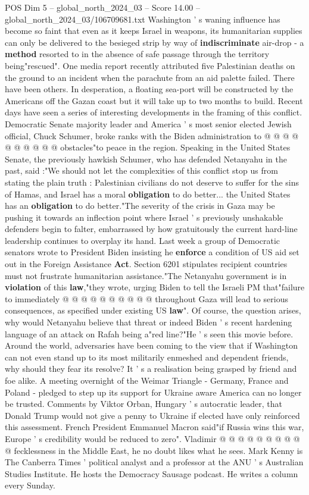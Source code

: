 \begin{textsample}{POS Dim 5 – global\_north\_2024\_03 – Score 14.00 – global\_north\_2024\_03/106709681.txt}
Washington ' s waning influence has become so faint that even as it keeps Israel in weapons, its humanitarian supplies can only be delivered to the besieged strip by way of \textbf{indiscriminate} air-drop - a \textbf{method} resorted to in the absence of safe passage through the territory being"rescued".
One media report recently attributed five Palestinian deaths on the ground to an incident when the parachute from an aid palette failed.
There have been others.
In desperation, a floating sea-port will be constructed by the Americans off the Gazan coast but it will take up to two months to build.
Recent days have seen a series of interesting developments in the framing of this conflict.
Democratic Senate majority leader and America ' s most senior elected Jewish official, Chuck Schumer, broke ranks with the Biden administration to @ @ @ @ @ @ @ @ @ @ obstacles"to peace in the region.
Speaking in the United States Senate, the previously hawkish Schumer, who has defended Netanyahu in the past, said :"We should not let the complexities of this conflict stop us from stating the plain truth : Palestinian civilians do not deserve to suffer for the sins of Hamas, and Israel has a moral \textbf{obligation} to do better... the United States has an \textbf{obligation} to do better."The severity of the crisis in Gaza may be pushing it towards an inflection point where Israel ' s previously unshakable defenders begin to falter, embarrassed by how gratuitously the current hard-line leadership continues to overplay its hand.
Last week a group of Democratic senators wrote to President Biden insisting he \textbf{enforce} a condition of US aid set out in the Foreign Assistance \textbf{Act}.
Section 6201 stipulates recipient countries must not frustrate humanitarian assistance."The Netanyahu government is in \textbf{violation} of this \textbf{law},"they wrote, urging Biden to tell the Israeli PM that"failure to immediately @ @ @ @ @ @ @ @ @ @ throughout Gaza will lead to serious consequences, as specified under existing US \textbf{law}".
Of course, the question arises, why would Netanyahu believe that threat or indeed Biden ' s recent hardening language of an attack on Rafah being a"red line?"He ' s seen this movie before.
Around the world, adversaries have been coming to the view that if Washington can not even stand up to its most militarily enmeshed and dependent friends, why should they fear its resolve?
It ' s a realisation being grasped by friend and foe alike.
A meeting overnight of the Weimar Triangle - Germany, France and Poland - pledged to step up its support for Ukraine aware America can no longer be trusted.
Comments by Viktor Orban, Hungary ' s autocratic leader, that Donald Trump would not give a penny to Ukraine if elected have only reinforced this assessment.
French President Emmanuel Macron said"if Russia wins this war, Europe ' s credibility would be reduced to zero".
Vladimir @ @ @ @ @ @ @ @ @ @ fecklessness in the Middle East, he no doubt likes what he sees.
Mark Kenny is The Canberra Times ' political analyst and a professor at the ANU ' s Australian Studies Institute.
He hosts the Democracy Sausage podcast.
He writes a column every Sunday.


\end{textsample}
